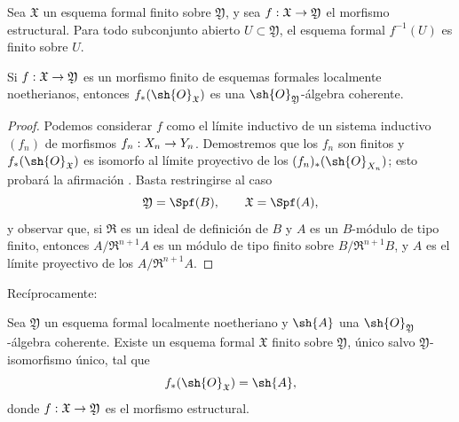 \documentclass[oneside]{amsart}
\makeatletter
\newcommand{\ega@arrow}[2]{\mathchoice{#1}{#2}{#2}{#2}}
\renewcommand{\to}{\ega@arrow{\longrightarrow}{\rightarrow}}
\let\EGAOriginalLabel\label
\renewcommand{\label}[1]{\phantomsection\EGAOriginalLabel{#1}}
\makeatother
\begin{document}
\begin{corollary}[4.8.5]
\label{III.4.8.5}
Sea $\mathfrak{X}$ un esquema formal finito sobre
$\mathfrak{Y}$, y sea
$f:\mathfrak{X}\to\mathfrak{Y}$ el morfismo estructural. Para
todo subconjunto abierto $U\subset\mathfrak{Y}$, el esquema formal
$f^{-1}(U)$ es finito sobre $U$.
\end{corollary}

\begin{proposition}[4.8.6]
\label{III.4.8.6}
Si $f:\mathfrak{X}\to\mathfrak{Y}$ es un morfismo finito de esquemas
formales localmente noetherianos, entonces
$f_*(\sh{O}_{\mathfrak{X}})$ es una
$\sh{O}_{\mathfrak{Y}}$-álgebra coherente.
\end{proposition}

\begin{proof}
Podemos considerar $f$ como el límite inductivo de un sistema inductivo
$(f_n)$ de morfismos $f_n:X_n\to Y_n$. Demostremos que los
$f_n$ son finitos y $f_*(\sh{O}_{\mathfrak{X}})$ es
isomorfo al límite proyectivo de los
$(f_n)_*(\sh{O}_{X_n})$; esto probará la afirmación
. Basta restringirse al caso
\[
  \mathfrak{Y}=\Spf(B),\qquad \mathfrak{X}=\Spf(A),
\]
y observar que, si $\mathfrak{R}$ es un ideal de definición
de $B$ y $A$ es un $B$-módulo de tipo finito, entonces
$A/\mathfrak{R}^{n+1}A$ es un módulo de tipo finito sobre
$B/\mathfrak{R}^{n+1}B$, y $A$ es el límite proyectivo de los
$A/\mathfrak{R}^{n+1}A$.
\end{proof}

Recíprocamente:

\begin{proposition}[4.8.7]
\label{III.4.8.7}
Sea $\mathfrak{Y}$ un esquema formal localmente noetheriano y
$\sh{A}$ una $\sh{O}_{\mathfrak{Y}}$-álgebra coherente. Existe
un esquema formal $\mathfrak{X}$ finito sobre $\mathfrak{Y}$,
único salvo $\mathfrak{Y}$-isomorfismo único, tal que
\[
  f_*(\sh{O}_{\mathfrak{X}})=\sh{A},
\]
donde $f:\mathfrak{X}\to\mathfrak{Y}$ es el morfismo estructural.
\end{proposition}
\end{document}
